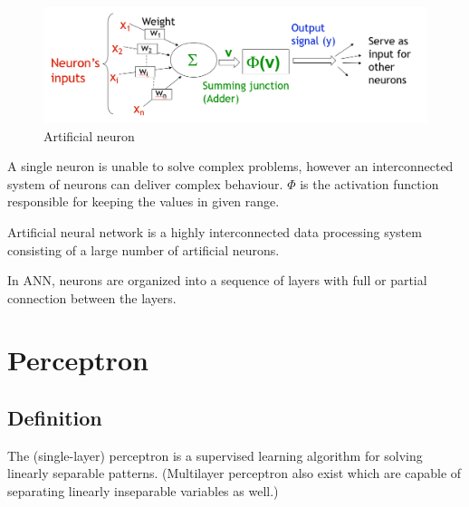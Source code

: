 \documentclass[a4paper,12pt,answers]{article}
\begin{document}
	\begin{figure}[H]
		\centering
		\includegraphics[width=0.7\linewidth]{artifical_neuron}
		\caption{Artificial neuron}
		\label{fig:artificalneuron}
	\end{figure}
	
	A single neuron is unable to solve complex problems, however an interconnected system of neurons can deliver complex behaviour. $\Phi$ is the activation function responsible for keeping the values in given range.
	
	Artificial neural network is a highly interconnected data processing system consisting of a large number of artificial neurons.
	
	In ANN, neurons are organized into a sequence of layers with full or partial connection between the layers. 
	
	
	
	\newpage
	\section{Perceptron}
	\subsection{Definition}
	The (single-layer) perceptron is a supervised learning algorithm for solving linearly separable patterns. (Multilayer perceptron also exist which are capable of separating linearly inseparable variables as well.)
	
\end{document}
